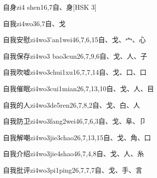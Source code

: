 \begin{entry}{自身}{zi4 shen1}{6,7}{⾃、⾝}[HSK 3]
\end{entry}

\begin{entry}{自我}{zi4wo3}{6,7}{⾃、⼽}
\end{entry}

\begin{entry}{自我安慰}{zi4wo3'an1wei4}{6,7,6,15}{⾃、⼽、⼧、⼼}
\end{entry}

\begin{entry}{自我保存}{zi4wo3 bao3cun2}{6,7,9,6}{⾃、⼽、⼈、⼦}
\end{entry}

\begin{entry}{自我吹嘘}{zi4wo3chui1xu1}{6,7,7,14}{⾃、⼽、⼝、⼝}
\end{entry}

\begin{entry}{自我催眠}{zi4wo3cui1mian2}{6,7,13,10}{⾃、⼽、⼈、⽬}
\end{entry}

\begin{entry}{自我的人}{zi4wo3de5ren2}{6,7,8,2}{⾃、⼽、⽩、⼈}
\end{entry}

\begin{entry}{自我防卫}{zi4wo3fang2wei4}{6,7,6,3}{⾃、⼽、⾩、⼙}
\end{entry}

\begin{entry}{自我解嘲}{zi4wo3jie3chao2}{6,7,13,15}{⾃、⼽、⾓、⼝}
\end{entry}

\begin{entry}{自我介绍}{zi4wo3jie4shao4}{6,7,4,8}{⾃、⼽、⼈、⽷}
\end{entry}

\begin{entry}{自我批评}{zi4wo3pi1ping2}{6,7,7,7}{⾃、⼽、⼿、⾔}
\end{entry}

